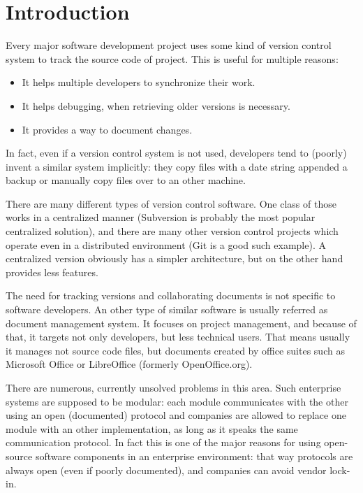 \section{Introduction}

Every major software development project uses some kind of version control
system to track the source code of project. This is useful for multiple
reasons:

\begin{itemize}
\item It helps multiple developers to synchronize their work.
\item It helps debugging, when retrieving older versions is necessary.
\item It provides a way to document changes.
\end{itemize}

In fact, even if a version control system is not used, developers tend to
(poorly) invent a similar system implicitly: they copy files with a date string
appended a backup or manually copy files over to an other machine.

There are many different types of version control software. One class of those
works in a centralized manner (Subversion\cite{subversion} is probably the most
popular centralized solution), and there are many other version control
projects which operate even in a distributed environment (Git\cite{git} is a
good such example). A centralized version obviously has a simpler architecture,
but on the other hand provides less features.

The need for tracking versions and collaborating documents is not specific to
software developers. An other type of similar software is usually referred as
document management system. It focuses on project management, and because of
that, it targets not only developers, but less technical users. That means
usually it manages not source code files, but documents created by office
suites such as Microsoft Office\cite{mso} or LibreOffice\cite{lo} (formerly
OpenOffice.org\cite{ooo}).

There are numerous, currently unsolved problems in this area. Such enterprise
systems are supposed to be modular: each module communicates with the other
using an open (documented) protocol and companies are allowed to replace one
module with an other implementation, as long as it speaks the same
communication protocol. In fact this is one of the major reasons for using
open-source software components in an enterprise environment: that way
protocols are always open (even if poorly documented), and companies can avoid
vendor lock-in.

